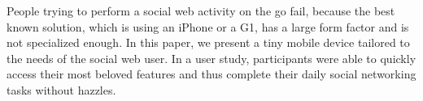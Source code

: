 
People trying to perform a social web activity on the go fail, because the best known solution, which is using an iPhone or a G1, 
has a large form factor and is not specialized enough. In this paper, we present a tiny mobile device tailored to the needs of 
the social web user. In a user study, participants were able to quickly access their most beloved features and thus complete 
their daily social networking tasks without hazzles.
